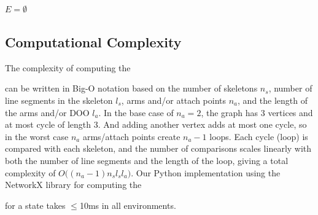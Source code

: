 \begin{algorithm}
    \caption{\addEdges}\label{chap5:alg:addEdges}
    \SetAlgoLined
    \DontPrintSemicolon
    
    
    $E = \emptyset$ \\
\end{algorithm}

\subsection{Computational Complexity}

The complexity of computing the \signature{} can be written in Big-O notation based on the number of skeletons $n_s$, number of line segments in the skeleton $l_s$, arms and/or attach points $n_a$, and the length of the arms and/or DOO $l_a$. In the base case of $n_a=2$, the graph has 3 vertices and at most cycle of length 3. And adding another vertex adds at most one cycle, so in the worst case $n_a$ arms/attach points create $n_a-1$ loops. Each cycle (loop) is compared with each skeleton, and the number of comparisons scales linearly with both the number of line segments and the length of the loop, giving a total complexity of $O\big((n_a-1) n_s l_s l_a\big)$. Our Python implementation using the NetworkX library \cite{NetworkX} for computing the \signature{} for a state takes $\leq$10ms in all environments.